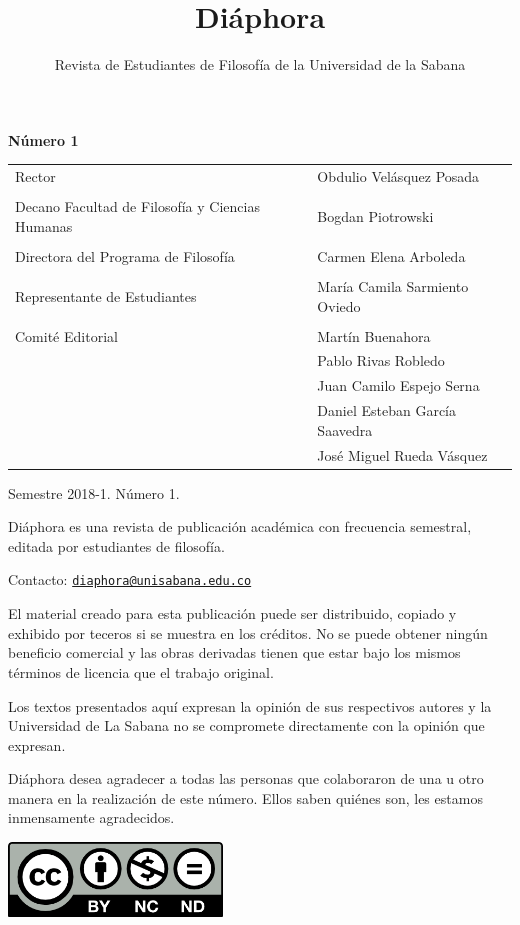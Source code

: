 \documentclass[]{book}
\begin{document}
\title{Diáphora}
\author{Revista de Estudiantes de Filosofía de la Universidad de la
Sabana}

\maketitle


\textbf{Número 1}



\begin{longtable}[]{@{}ll@{}}
\toprule
\midrule
\endhead
Rector & Obdulio Velásquez Posada\tabularnewline
&\tabularnewline
Decano Facultad de Filosofía y Ciencias Humanas & Bogdan
Piotrowski\tabularnewline
&\tabularnewline
Directora del Programa de Filosofía & Carmen Elena
Arboleda\tabularnewline
&\tabularnewline
Representante de Estudiantes & María Camila Sarmiento
Oviedo\tabularnewline
&\tabularnewline
Comité Editorial & Martín Buenahora \tabularnewline
& Pablo Rivas Robledo\tabularnewline
& Juan Camilo Espejo Serna\tabularnewline
& Daniel Esteban García Saavedra\tabularnewline
& José Miguel Rueda Vásquez\tabularnewline
\bottomrule
\end{longtable}

\noindent Semestre 2018-1. Número 1.

\noindent Diáphora es una revista de publicación académica con frecuencia
semestral, editada por estudiantes de filosofía.

\noindent Contacto: \href{mailto:diaphora@unisabana.edu.co}{\nolinkurl{diaphora@unisabana.edu.co}}



El material creado para esta publicación puede ser distribuido, copiado
y exhibido por teceros si se muestra en los créditos. No se puede
obtener ningún beneficio comercial y las obras derivadas tienen que
estar bajo los mismos términos de licencia que el trabajo original.

Los textos presentados aquí expresan la opinión de sus respectivos
autores y la Universidad de La Sabana no se compromete directamente con
la opinión que expresan.

Diáphora desea agradecer a todas las personas que colaboraron de una u
otro manera en la realización de este número. Ellos saben quiénes son,
les estamos inmensamente agradecidos.
\begin{center}
\includegraphics[width=2.24419in,height=0.78333in]{media/image1.png}
\end{center}
\end{document}
